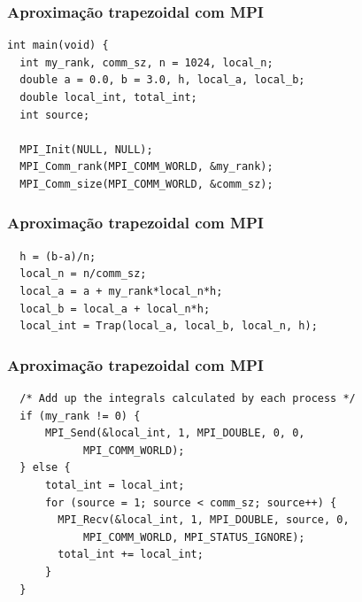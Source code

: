 \documentclass[xcolor={usenames,dvipsnames},12pt,presentation,aspectratio=169]{beamer}
\begin{document}
\begin{frame}[fragile]
  \frametitle{Aproximação trapezoidal com MPI}
\begin{center}
\begin{minipage}{0.95\textwidth}
  \begin{verbatim}
int main(void) {
  int my_rank, comm_sz, n = 1024, local_n;   
  double a = 0.0, b = 3.0, h, local_a, local_b;
  double local_int, total_int;
  int source; 

  MPI_Init(NULL, NULL);
  MPI_Comm_rank(MPI_COMM_WORLD, &my_rank);
  MPI_Comm_size(MPI_COMM_WORLD, &comm_sz);
  \end{verbatim}
\end{minipage}
\end{center}
\end{frame}
\begin{frame}[fragile]
  \frametitle{Aproximação trapezoidal com MPI}
\begin{center}
\begin{minipage}{0.95\textwidth}
  \begin{verbatim}
  h = (b-a)/n;    
  local_n = n/comm_sz; 
  local_a = a + my_rank*local_n*h;
  local_b = local_a + local_n*h;
  local_int = Trap(local_a, local_b, local_n, h);
  \end{verbatim}
\end{minipage}
\end{center}
\end{frame}
\begin{frame}[fragile]
  \frametitle{Aproximação trapezoidal com MPI}
\begin{center}
\begin{minipage}{0.95\textwidth}
  \begin{verbatim}
  /* Add up the integrals calculated by each process */
  if (my_rank != 0) { 
      MPI_Send(&local_int, 1, MPI_DOUBLE, 0, 0, 
            MPI_COMM_WORLD); 
  } else {
      total_int = local_int;
      for (source = 1; source < comm_sz; source++) {
        MPI_Recv(&local_int, 1, MPI_DOUBLE, source, 0,
            MPI_COMM_WORLD, MPI_STATUS_IGNORE);
        total_int += local_int;
      }
  } 
  \end{verbatim}
\end{minipage}
\end{center}
\end{frame}
\end{document}
